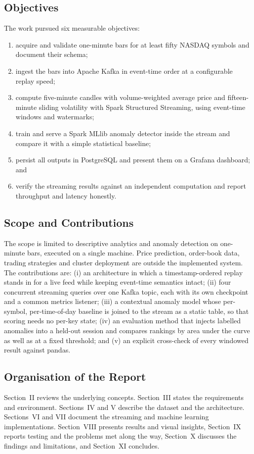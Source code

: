 \documentclass[conference]{IEEEtran}
\begin{document}
\subsection{Objectives}
The work pursued six measurable objectives:
\begin{enumerate}
\item acquire and validate one-minute bars for at least fifty NASDAQ symbols and document their schema;
\item ingest the bars into Apache Kafka in event-time order at a configurable replay speed;
\item compute five-minute candles with volume-weighted average price and fifteen-minute sliding volatility with Spark Structured Streaming, using event-time windows and watermarks;
\item train and serve a Spark MLlib anomaly detector inside the stream and compare it with a simple statistical baseline;
\item persist all outputs in PostgreSQL and present them on a Grafana dashboard; and
\item verify the streaming results against an independent computation and report throughput and latency honestly.
\end{enumerate}

\subsection{Scope and Contributions}
The scope is limited to descriptive analytics and anomaly detection on one-minute bars, executed on a single machine. Price prediction, order-book data, trading strategies and cluster deployment are outside the implemented system. The contributions are: (i) an architecture in which a timestamp-ordered replay stands in for a live feed while keeping event-time semantics intact; (ii) four concurrent streaming queries over one Kafka topic, each with its own checkpoint and a common metrics listener; (iii) a contextual anomaly model whose per-symbol, per-time-of-day baseline is joined to the stream as a static table, so that scoring needs no per-key state; (iv) an evaluation method that injects labelled anomalies into a held-out session and compares rankings by area under the curve as well as at a fixed threshold; and (v) an explicit cross-check of every windowed result against pandas.

\subsection{Organisation of the Report}
Section~II reviews the underlying concepts. Section~III states the requirements and environment. Sections~IV and V describe the dataset and the architecture. Sections~VI and VII document the streaming and machine learning implementations. Section~VIII presents results and visual insights, Section~IX reports testing and the problems met along the way, Section~X discusses the findings and limitations, and Section~XI concludes.
\end{document}
